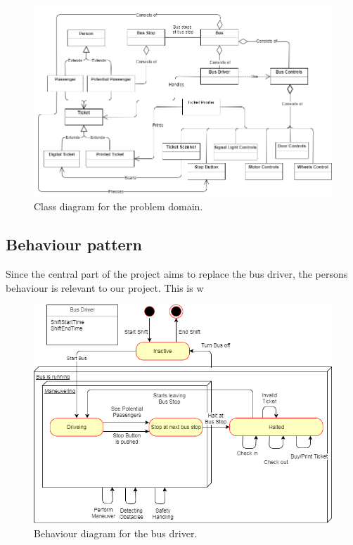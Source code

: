 \begin{figure}[H]
\centering
\includegraphics[scale=0.49]{Images/problem_domain_class_diagram.png}
\caption{Class diagram for the problem domain.}
\label{problem-domain-class-diagram}
\end{figure}


\subsection{Behaviour pattern}

Since the central part of the project aims to replace the bus driver, the persons behaviour is relevant to our project. This is w

\begin{figure}[H]
\centering
\includegraphics[scale=0.6]{Images/BehaviorDiagramBusDriver.png}
\caption{Behaviour diagram for the bus driver.}
\label{BehaviorDiagramBusDriver}
\end{figure}